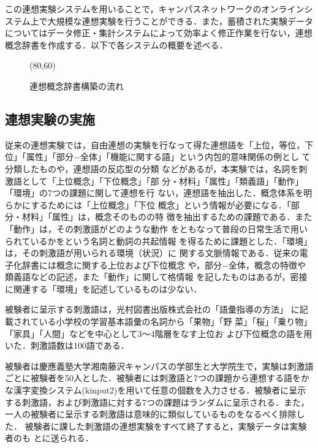 この連想実験システムを用いることで，キャンパスネットワークのオンラインシ
ステム上で大規模な連想実験を行うことができる．また，蓄積された実験データ
についてはデータ修正・集計システムによって効率よく修正作業を行ない，連想
概念辞書を作成する．以下で各システムの概要を述べる．

\begin{figure}[htb]
\begin{center}
\atari(80,60)
\caption{連想概念辞書構築の流れ}
\end{center}
\end{figure}


\subsection{連想実験の実施}

従来の連想実験では，自由連想の実験を行なって得た連想語を「上位，等位，下
位」「属性」「部分−全体」「機能に関する語」という内包的意味関係の例とし
て分類したもの\cite{miller1991}や，連想語の反応型の分類\cite{Yukawa1984}
などがあるが，本実験では，名詞を刺激語として「上位概念」「下位概念」「部
分・材料」「属性」「類義語」「動作」「環境」の7つの課題に関して連想を行
ない，連想語を抽出した．概念体系を明らかにするためには「上位概念」「下位
概念」という情報が必要になる．「部分・材料」「属性」は，概念そのものの特
徴を抽出するための課題である．また「動作」は，その刺激語がどのような動作
をともなって普段の日常生活で用いられているかをという名詞と動詞の共起情報
を得るために課題とした．「環境」は，その刺激語が用いられる環境（状況）に
関する文脈情報である．従来の電子化辞書には概念に関する上位および下位概念
や，部分−全体，概念の特徴や類義語などの記述，また「動作」に関して格情報
を記したものはあるが，密接に関連する「環境」を記述しているものは少ない．

被験者に呈示する刺激語は，光村図書出版株式会社の「語彙指導の方法」
\cite{Kai1996}に記載されている小学校の学習基本語彙の名詞から「果物」「野
菜」「桜」「乗り物」「家具」「人間」などを中心として3〜4階層をなす上位お
よび下位概念の語を用いた．刺激語数は100語である．

被験者は慶應義塾大学湘南藤沢キャンパスの学部生と大学院生で，実験は刺激語
ごとに被験者を50人とした．被験者には刺激語と7つの課題から連想する語をか
な漢字変換システム(kinput2)を用いて任意の個数を入力させる．被験者に呈示
する刺激語，および刺激語に対する7つの課題はランダムに呈示される．また，
一人の被験者に呈示する刺激語は意味的に類似しているものをなるべく排除した．
被験者に課した刺激語の連想実験をすべて終了すると，実験データは実験者のも
とに送られる．

